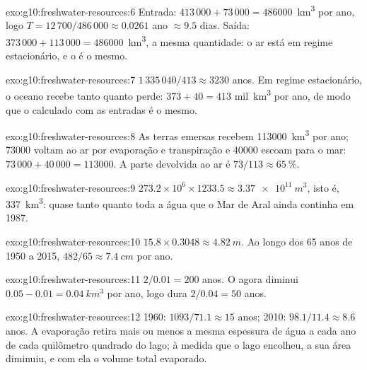 \begin{solution}{exo:g10:freshwater-resources:6}
Entrada: $413\,000 + 73\,000 = \num{486000}$~\unit{km^3} por ano, logo
$T = 12\,700/486\,000 \approx \num{0.0261}$ ano $\approx \num{9.5}$ dias.
Saída: $373\,000 + 113\,000 = \num{486000}$~\unit{km^3}, a mesma quantidade:
o ar está em regime estacionário, e o  é o mesmo.
\end{solution}

\begin{solution}{exo:g10:freshwater-resources:7}
$1\,335\,040/413 \approx \num{3230}$ anos. Em regime estacionário, o oceano
recebe tanto quanto perde: $373 + 40 = 413$ mil~\unit{km^3} por ano, de
modo que o  calculado com as entradas é o mesmo.
\end{solution}

\begin{solution}{exo:g10:freshwater-resources:8}
As terras emersas recebem \num{113000}~\unit{km^3} por ano; \num{73000}
voltam ao ar por evaporação e transpiração e \num{40000} escoam para o mar:
$73\,000 + 40\,000 = \num{113000}$. A parte devolvida ao ar é
$73/113 \approx \qty{65}{\percent}$.
\end{solution}

\begin{solution}{exo:g10:freshwater-resources:9}
$273.2 \times 10^6 \times 1233.5 \approx \qty{3.37e11}{m^3}$, isto é,
\qty{337}{km^3}: quase tanto quanto toda a água que o Mar de Aral ainda
continha em 1987.
\end{solution}

\begin{solution}{exo:g10:freshwater-resources:10}
$15.8 \times 0.3048 \approx \qty{4.82}{m}$. Ao longo dos 65 anos de 1950 a
2015, $482/65 \approx \qty{7.4}{cm}$ por ano.
\end{solution}

\begin{solution}{exo:g10:freshwater-resources:11}
$2/0.01 = 200$ anos. O  agora diminui $0.05 - 0.01 =
\qty{0.04}{km^3}$ por ano, logo dura $2/0.04 = 50$ anos.
\end{solution}

\begin{solution}{exo:g10:freshwater-resources:12}
1960: $1093/71.1 \approx 15$ anos; 2010: $98.1/11.4 \approx 8.6$ anos. A
evaporação retira mais ou menos a mesma espessura de água a cada ano de cada
quilômetro quadrado do lago; à medida que o lago encolheu, a sua área
diminuiu, e com ela o volume total evaporado.
\end{solution}

